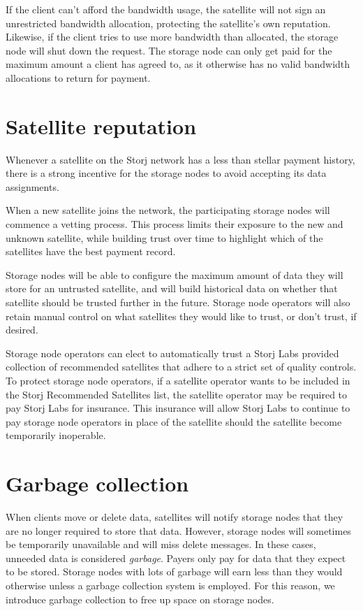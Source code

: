 \documentclass[11pt,fleqn,openany]{book}
\begin{document}
If the client can't afford the bandwidth usage, the satellite will not sign an
unrestricted bandwidth allocation, protecting the satellite's own reputation.
Likewise, if the client tries to use more bandwidth than allocated,
the storage node will shut down the request.
The storage node can only get paid for the maximum amount a client has agreed
to,
as it otherwise has no valid bandwidth allocations to return for
payment.

\section{Satellite reputation}

Whenever a satellite on the Storj network has a less than stellar payment history,
there is a strong incentive for the storage nodes to avoid accepting its data
assignments.

When a new satellite joins the network, the participating storage nodes will
commence a vetting process. This process limits their exposure to the new and unknown
satellite, while building trust over time to highlight which of the
satellites have the best payment record.

Storage nodes will be able to configure the maximum amount of data they will
store for an untrusted satellite, and will build historical data on whether
that satellite should be trusted further in the future.
Storage node operators will also retain manual control on what satellites they
would like to trust, or don't trust, if desired.

Storage node operators can elect to automatically trust a Storj Labs
provided collection of recommended satellites that adhere to a strict set of
quality controls.
To protect storage node operators, if a satellite operator wants to be
included in the Storj Recommended Satellites list, the satellite operator may
be required to pay Storj Labs for insurance. This insurance will allow Storj
Labs to continue to pay storage node operators in place of the satellite should
the satellite become temporarily inoperable.

\section{Garbage collection}\label{sec:garbage-collection}

When clients move or delete data, satellites will notify storage nodes
that they are no longer required to store that data. However,
storage nodes will sometimes be temporarily unavailable and will miss delete
messages. In these cases, unneeded data is considered
{\em garbage}. Payers only pay for data that they expect to be stored. Storage
nodes with lots of garbage will earn less than they would
otherwise unless a garbage collection system is employed. For this reason, we
introduce garbage collection to free up space on storage nodes.
\end{document}
